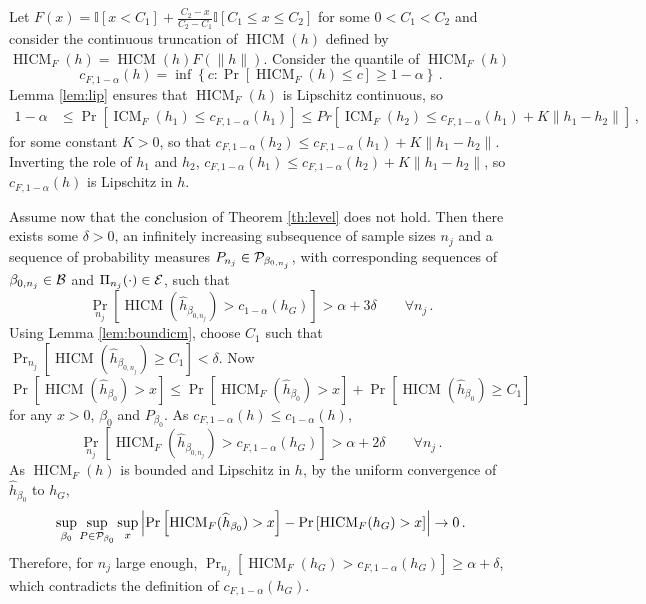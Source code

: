 \documentclass[12pt]{article}
\newcommand{\1}{\mathbf{1}}
\newcommand{\HICM}{\operatorname{HICM}}
\newcommand{\ICM}{\operatorname{ICM}}
\def\ind{\mathbb{I}}
\begin{document}
Let  $F (x) = \ind \left[ x < C_{1}\right] +
\frac{C_2-x}{C_{2}-C_{1}} \ind\left[ C_{1} \leq x \leq C_{2}\right]$
for some $0<C_{1} < C_{2}$ and consider the continuous truncation of
$\HICM(h)$ defined by
$
\HICM_{F} ( h) = \HICM (h) F(\|h\|)
$.
Consider the quantile of $\HICM_{F} (h)$
\[
c_{F,1-\alpha}(h) = \inf \left\{ c : \Pr\left[
\HICM_{F} (h) \leq c \right] \geq 1-\alpha \right\}
\, .
\]
Lemma \ref{lem:lip} ensures that $\HICM_{F}(h)$ is Lipschitz
continuous, so
\begin{align*}
1 - \alpha & \leq \Pr \left[ \ICM_{F} (h_1) \leq c_{F,1-\alpha}(h_1)
\right]
\leq Pr \left[ \ICM_{F} (h_2) \leq c_{F,1-\alpha}(h_1) + K\|h_{1}-h_{2}\|
\right]
\, ,
\end{align*}
for some constant $K>0$,
so that $c_{F,1-\alpha}(h_2) \leq c_{F,1-\alpha}(h_1) +
K\|h_{1}-h_{2}\|$.
Inverting the role of $h_{1}$ and $h_{2}$,
$c_{F,1-\alpha}(h_1) \leq c_{F,1-\alpha}(h_2) + K\|h_{1}-h_{2}\|$, so
 $c_{F,1-\alpha}(h)$ is Lipschitz in $h$.

Assume now that the conclusion of Theorem \ref{th:level} does not
hold. Then there exists some $\delta>0$, an infinitely increasing
subsequence of sample sizes $n_{j}$ and a sequence of probability
measures $P_{n_{j}} \in {\cal P}_{\beta_{0,n_{j}}}$, with corresponding
sequences of $\beta_{0,n_{j}} \in {\cal B}$ and $\Pi_{n_{j}}(\cdot)
\in {\cal E}$, such that
\[
\Pr_{n_{j}} \left[ \HICM (\widehat{h}_{\beta_{0,n_{j}}}) > c_{1-\alpha} (h_{{G}})
\right]
> \alpha + 3 \delta \qquad \forall n_{j}
\, .
\]
Using Lemma \ref{lem:boundicm}, choose $C_{1}$ such that
$
\Pr_{n_{j}} \left[  \HICM  (\widehat{h}_{\beta_{0,n_{j}}})
 \geq C_{1}  \right] < {\delta}
$. Now
\[
\Pr \left[ \HICM (\widehat{h}_{\beta_{0}}) > x \right] \leq \Pr\left[
\HICM_{F}  (\widehat{h}_{\beta_{0}}) > x \right]
+ \Pr \left[ \HICM (\widehat{h}_{\beta_{0}})
 \geq C_{1} \right]
\]
for any $x>0$,  $\beta_{0}$ and $P_{\beta_{0}}$.
As $c_{F,1-\alpha}(h) \leq c_{1-\alpha}(h)$,
\[
\Pr_{n_{j}} \left[ \HICM_{F}  (\widehat{h}_{\beta_{0,n_{j}}})
 > c_{F,1-\alpha} (h_{{G}})
\right]
> \alpha + 2 {\delta}
\qquad \forall n_{j}
\, .
\]
As $\HICM_{F} (h)$ is bounded and  Lipschitz in $h$, by the  uniform convergence
of $\widehat{h}_{\beta_{0}}$ to $h_{{G}}$,
\[
\sup_{\beta_{0}} \sup_{P \in {\cal P}_{\beta_0}} \sup_{x}
\left|
\Pr \left[ \HICM_{F} (\widehat{h}_{\beta_0}) > x \right]
-
\Pr \left[ \HICM_{F} (h_{{G}}) > x \right]
\right|
\rightarrow 0
\, .
\]
Therefore, for $n_{j}$ large enough,
$
\Pr_{n_{j}} \left[ \HICM_{F} (h_{{G}}) > c_{F,1-\alpha} (h_{{G}})
\right] \geq \alpha + {\delta}
$,
which contradicts the definition of $c_{F,1-\alpha}(h_{{G}})$.
\end{document}
